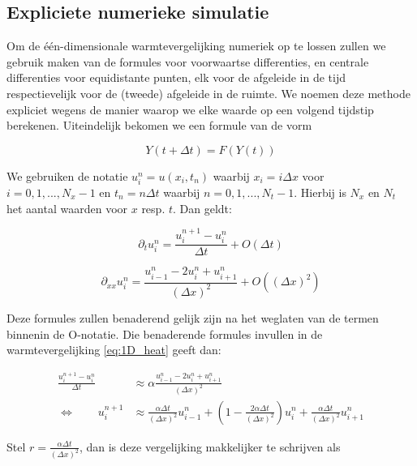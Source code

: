 \documentclass[a4paper,kulak]{kulakarticle} %
\begin{document}
\subsection{Expliciete numerieke simulatie}
\label{sec:explicit_numerical_simul}

Om de één-dimensionale warmtevergelijking numeriek op te lossen zullen we gebruik maken van de formules voor voorwaartse differenties, en centrale differenties voor equidistante punten, elk voor de afgeleide in de tijd respectievelijk voor de (tweede) afgeleide in de ruimte. %
We noemen deze methode expliciet wegens de manier waarop we elke waarde op een volgend tijdstip berekenen. Uiteindelijk bekomen we een formule van de vorm %

\begin{equation*}
	Y(t + \Delta t) = F(Y(t))
\end{equation*}

We gebruiken de notatie $u_i^n = u(x_i, t_n)$ waarbij $x_i = i\Delta x$ voor $i = 0, 1, ..., N_x-1$ en $t_n = n\Delta t$ waarbij $n = 0, 1, ..., N_t - 1$. Hierbij is $N_x$ en $N_t$ het aantal waarden voor $x$ resp. $t$.
Dan geldt:

\begin{equation}
	\partial_t u_i^n = \frac{u_i^{n+1} - u_i^n}{\Delta t} + O(\Delta t)
	\label{eq:diff_time}
\end{equation}

\begin{equation}
	\partial_{xx} u_i^n = \frac{u_{i-1}^n - 2 u_i^n + u_{i+1}^n}{(\Delta x)^2} + O((\Delta x)^2)
	\label{eq:diff_space}
\end{equation}

Deze formules zullen benaderend gelijk zijn na het weglaten van de termen binnenin de O-notatie. Die benaderende formules invullen in de warmtevergelijking \ref{eq:1D_heat} geeft dan:

\begin{align*}
	\frac{u_i^{n+1} - u_i^n}{\Delta t} &\approx \alpha \frac{u_{i-1}^n - 2 u_i^n + u_{i+1}^n}{(\Delta x)^2} \\
	\Leftrightarrow \qquad u_i^{n+1} &\approx \frac{\alpha \Delta t}{(\Delta x)^2} u_{i-1}^n + \left( 1 - \frac{2 \alpha \Delta t}{(\Delta x)^2} \right) u_i^n + \frac{\alpha \Delta t}{(\Delta x)^2} u_{i+1}^n 
\end{align*}

Stel $r = \frac{\alpha \Delta t}{(\Delta x)^2}$, dan is deze vergelijking makkelijker te schrijven als
\end{document}

